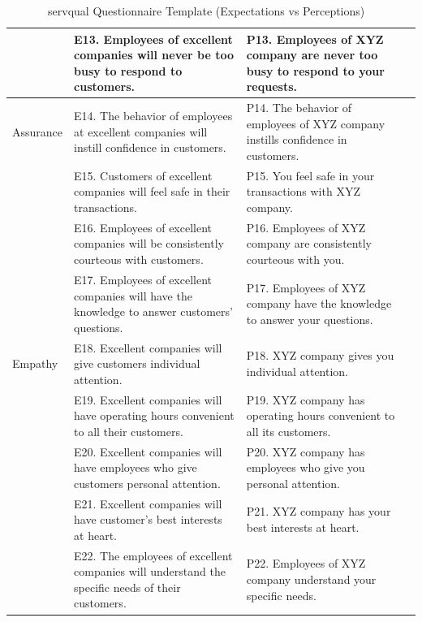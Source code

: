 \begin{table}[ht]
{\begin{tabular}{p{2.5cm} p{6cm} p{6cm} p{1.5cm}}
 & E13. Employees of excellent companies will never be too busy to respond to customers. & P13. Employees of XYZ company are never too busy to respond to your requests. & \\
\hline
Assurance & E14. The behavior of employees at excellent companies will instill confidence in customers. & P14. The behavior of employees of XYZ company instills confidence in customers. & \\
 & E15. Customers of excellent companies will feel safe in their transactions. & P15. You feel safe in your transactions with XYZ company. & \\
 & E16. Employees of excellent companies will be consistently courteous with customers. & P16. Employees of XYZ company are consistently courteous with you. & \\
 & E17. Employees of excellent companies will have the knowledge to answer customers’ questions. & P17. Employees of XYZ company have the knowledge to answer your questions. & \\
\hline
Empathy & E18. Excellent companies will give customers individual attention. & P18. XYZ company gives you individual attention. & \\
 & E19. Excellent companies will have operating hours convenient to all their customers. & P19. XYZ company has operating hours convenient to all its customers. & \\
 & E20. Excellent companies will have employees who give customers personal attention. & P20. XYZ company has employees who give you personal attention. & \\
 & E21. Excellent companies will have customer’s best interests at heart. & P21. XYZ company has your best interests at heart. & \\
 & E22. The employees of excellent companies will understand the specific needs of their customers. & P22. Employees of XYZ company understand your specific needs. & \\
\hline
\end{tabular}
}
\caption{\ac{servqual} Questionnaire Template (Expectations vs Perceptions) ~\cite{master_servqual_model}} 
\label{table:servqual_template}
\end{table}



